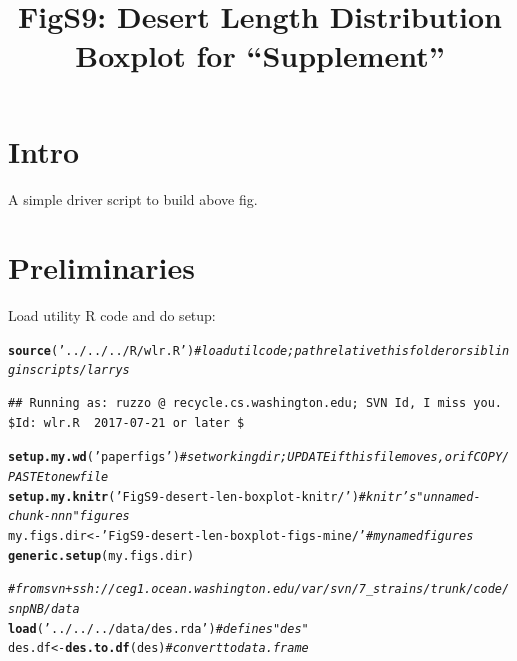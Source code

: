\documentclass{article}\usepackage[]{graphicx}\usepackage[]{color}
\makeatletter
\newcommand{\hlstr}[1]{\textcolor[rgb]{0.192,0.494,0.8}{#1}}%
\newcommand{\hlcom}[1]{\textcolor[rgb]{0.678,0.584,0.686}{\textit{#1}}}%
\newcommand{\hlstd}[1]{\textcolor[rgb]{0.345,0.345,0.345}{#1}}%
\newcommand{\hlkwb}[1]{\textcolor[rgb]{0.69,0.353,0.396}{#1}}%
\newcommand{\hlkwd}[1]{\textcolor[rgb]{0.737,0.353,0.396}{\textbf{#1}}}%
\newenvironment{kframe}{%
 \def\at@end@of@kframe{}%
 \ifinner\ifhmode%
  \def\at@end@of@kframe{\end{minipage}}%
  \begin{minipage}{\columnwidth}%
 \fi\fi%
 \def\FrameCommand##1{\hskip\@totalleftmargin \hskip-\fboxsep
 \colorbox{shadecolor}{##1}\hskip-\fboxsep
     \hskip-\linewidth \hskip-\@totalleftmargin \hskip\columnwidth}%
 \MakeFramed {\advance\hsize-\width
   \@totalleftmargin\z@ \linewidth\hsize
   \@setminipage}}%
 {\par\unskip\endMakeFramed%
 \at@end@of@kframe}
\newenvironment{knitrout}{}{} %
\makeatother
\begin{document}
\title{FigS9: Desert Length Distribution Boxplot for ``Supplement''}
\maketitle

\tableofcontents

\section{Intro}
A simple driver script to build above fig.  

\section{Preliminaries}
Load utility R code and do setup:

\begin{knitrout}\footnotesize
{}\color{fgcolor}\begin{kframe}
\begin{alltt}
\hlkwd{source}\hlstd{(}\hlstr{'../../../R/wlr.R'}\hlstd{)} \hlcom{# load util code; path relative this folder or sibling in scripts/larrys }
\end{alltt}
\begin{verbatim}
## Running as: ruzzo @ recycle.cs.washington.edu; SVN Id, I miss you.  $Id: wlr.R  2017-07-21 or later $
\end{verbatim}
\begin{alltt}
\hlkwd{setup.my.wd}\hlstd{(}\hlstr{'paperfigs'}\hlstd{)}   \hlcom{# set working dir; UPDATE if this file moves, or if COPY/PASTE to new file}
\hlkwd{setup.my.knitr}\hlstd{(}\hlstr{'FigS9-desert-len-boxplot-knitr/'}\hlstd{)} \hlcom{# knitr's "unnamed-chunk-nnn" figures}
\hlstd{my.figs.dir} \hlkwb{<-} \hlstr{'FigS9-desert-len-boxplot-figs-mine/'}  \hlcom{# my named figures}
\hlkwd{generic.setup}\hlstd{(my.figs.dir)}
\end{alltt}
\end{kframe}
\end{knitrout}
\begin{knitrout}\footnotesize
{}\color{fgcolor}\begin{kframe}
\begin{alltt}
\hlcom{# from svn+ssh://ceg1.ocean.washington.edu/var/svn/7_strains/trunk/code/snpNB/data}
\hlkwd{load}\hlstd{(}\hlstr{'../../../data/des.rda'}\hlstd{)} \hlcom{# defines "des"}
\hlstd{des.df} \hlkwb{<-} \hlkwd{des.to.df}\hlstd{(des)}      \hlcom{# convert to data.frame}
\end{alltt}
\end{kframe}
\end{knitrout}
\end{document}

